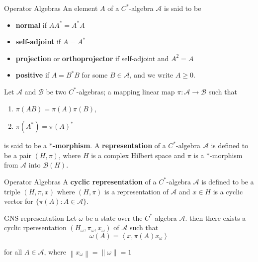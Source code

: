 \documentclass{beamer}
\begin{document}
        \begin{frame}{Operator Algebras}
            An element \(A\) of a \(C^\ast\)-algebra \(\mathcal{A}\) is said to be
            \begin{itemize}
                \item \textbf{normal} if \(AA^\ast=A^\ast A\)
                \item \textbf{self-adjoint} if \(A=A^\ast\)
                \item \textbf{projection} or \textbf{orthoprojector} if self-adjoint and \(A^2 = A\)
                \item \textbf{positive} if \(A=B^\ast B\) for some \(B \in \mathcal{A}\), and we write \(A \ge 0\).
            \end{itemize}
            Let \(\mathcal{A}\) and \(\mathcal{B}\) be two \(C^\ast\)-algebras; a mapping linear map \(\pi:\mathcal{A} \to \mathcal{B}\) such that
            \begin{enumerate}
                \item \(\pi(AB)=\pi(A)\pi(B)\),
                \item \(\pi(A^\ast)=\pi(A)^\ast\)
            \end{enumerate}
            is said to be a \textbf{\(\ast\)-morphism}. A \textbf{representation} of a \(C^\ast\)-algebra \(\mathcal{A}\) is defined to be a pair \((H,\pi)\), where \(H\) is a complex Hilbert space and \(\pi\) is a \(\ast\)-morphism from \(\mathcal{A}\) into \(\mathcal{B}(H)\).
        \end{frame}
        \begin{frame}{Operator Algebras}
            A \textbf{cyclic representation} of a \(C^\ast\)-algebra \(\mathcal{A}\) is defined to be a triple \((H,\pi,x)\) where \((H,\pi)\) is a representation of \(\mathcal{A}\) and \(x \in H\) is a cyclic vector for \(\{\pi(A): A \in \mathcal{A}\}\).
            \begin{block}{GNS representation}
                Let \(\omega\) be a state over the \(C^\ast\)-algebra \(\mathcal{A}\). then there exists a cyclic rperesentation \((H_{\omega},\pi_{\omega},x_{\omega})\) of \(\mathcal{A}\) such that
                \[\omega(A) = \left \langle x,\pi(A)x_{\omega} \right \rangle\]
            \end{block}
            for all \(A \in \mathcal{A}\), where \(\left \lVert x_{\omega} \right \rVert=\left \lVert \omega \right \rVert=1\)
        \end{frame}
\end{document}
